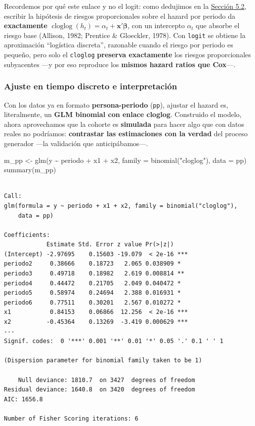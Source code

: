 \documentclass[
  letterpaper,
  DIV=11,
  numbers=noendperiod]{scrartcl}
\newenvironment{Shaded}{\begin{snugshade}}{\end{snugshade}}
\newcommand{\AttributeTok}[1]{\textcolor[rgb]{0.40,0.45,0.13}{#1}}
\newcommand{\FunctionTok}[1]{\textcolor[rgb]{0.28,0.35,0.67}{#1}}
\newcommand{\NormalTok}[1]{\textcolor[rgb]{0.00,0.23,0.31}{#1}}
\newcommand{\OtherTok}[1]{\textcolor[rgb]{0.00,0.23,0.31}{#1}}
\newcommand{\SpecialCharTok}[1]{\textcolor[rgb]{0.37,0.37,0.37}{#1}}
\newcommand{\StringTok}[1]{\textcolor[rgb]{0.13,0.47,0.30}{#1}}
\begin{document}
Recordemos por qué este enlace y no el logit: como dedujimos en la
\protect\hyperlink{sec-u15-prop}{Sección 5.2}, escribir la hipótesis de
riesgos proporcionales sobre el hazard por periodo da
\textbf{exactamente}
\(\operatorname{cloglog}(h_t)=\alpha_t+\mathbf{x}'\boldsymbol\beta\),
con un intercepto \(\alpha_t\) que absorbe el riesgo base (Allison,
1982; Prentice \& Gloeckler, 1978). Con \texttt{logit} se obtiene la
aproximación ``logística discreta'', razonable cuando el riesgo por
periodo es pequeño, pero solo el \texttt{cloglog} \textbf{preserva
exactamente} los riesgos proporcionales subyacentes ---y por eso
reproduce los \textbf{mismos hazard ratios que Cox}---.

\hypertarget{sec-u15-lab}{%
\subsubsection{Ajuste en tiempo discreto e
interpretación}\label{sec-u15-lab}}

Con los datos ya en formato \textbf{persona-periodo} (\texttt{pp}),
ajustar el hazard es, literalmente, un \textbf{GLM binomial con enlace
cloglog}. Construido el modelo, ahora aprovechamos que la cohorte es
\textbf{simulada} para hacer algo que con datos reales no podríamos:
\textbf{contrastar las estimaciones con la verdad} del proceso generador
---la validación que anticipábamos---.

\begin{Shaded}
\begin{Highlighting}[]
\NormalTok{m\_pp }\OtherTok{\textless{}{-}} \FunctionTok{glm}\NormalTok{(y }\SpecialCharTok{\textasciitilde{}}\NormalTok{ periodo }\SpecialCharTok{+}\NormalTok{ x1 }\SpecialCharTok{+}\NormalTok{ x2, }\AttributeTok{family =} \FunctionTok{binomial}\NormalTok{(}\StringTok{"cloglog"}\NormalTok{), }\AttributeTok{data =}\NormalTok{ pp)}
\FunctionTok{summary}\NormalTok{(m\_pp)}
\end{Highlighting}
\end{Shaded}

\begin{verbatim}

Call:
glm(formula = y ~ periodo + x1 + x2, family = binomial("cloglog"), 
    data = pp)

Coefficients:
            Estimate Std. Error z value Pr(>|z|)    
(Intercept) -2.97695    0.15603 -19.079  < 2e-16 ***
periodo2     0.38666    0.18723   2.065 0.038909 *  
periodo3     0.49718    0.18982   2.619 0.008814 ** 
periodo4     0.44472    0.21705   2.049 0.040472 *  
periodo5     0.58974    0.24694   2.388 0.016931 *  
periodo6     0.77511    0.30201   2.567 0.010272 *  
x1           0.84153    0.06866  12.256  < 2e-16 ***
x2          -0.45364    0.13269  -3.419 0.000629 ***
---
Signif. codes:  0 '***' 0.001 '**' 0.01 '*' 0.05 '.' 0.1 ' ' 1

(Dispersion parameter for binomial family taken to be 1)

    Null deviance: 1810.7  on 3427  degrees of freedom
Residual deviance: 1640.8  on 3420  degrees of freedom
AIC: 1656.8

Number of Fisher Scoring iterations: 6
\end{verbatim}
\end{document}
